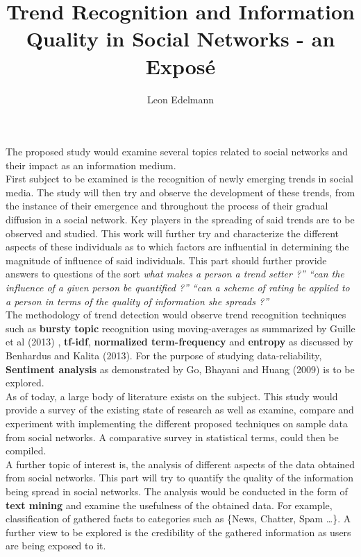 \documentclass[12pt]{article}
\begin{document}
\title{Trend Recognition and Information Quality in Social Networks - an Expos\'e}
\author{Leon Edelmann}

\maketitle
\section*{}
The proposed study would examine several topics related to social networks and their impact as an information medium. 
\\

First subject to be examined is the recognition of newly emerging trends in social media. The study will then try and observe the development of these trends, from the instance of their emergence and throughout the process of their gradual diffusion in a social network. Key players in the spreading of said trends are to be observed and studied. This work will further try and characterize the different aspects of these individuals as to which factors are influential in determining the magnitude of influence of said individuals.  This part should further provide answers to questions of the sort \textit{what makes a person a trend setter ?” “can the influence of a given person be quantified ?” “can a scheme of rating be applied to a person in terms of the quality of information she spreads ?”}
\\

The methodology of trend detection would observe trend recognition techniques such as \textbf{bursty topic} recognition using moving-averages as summarized by Guille et al (2013) \cite{guille}, \textbf{tf-idf}, \textbf{normalized term-frequency} and \textbf{entropy} as discussed by Benhardus and Kalita (2013)\cite{benhardus}. For the purpose of studying data-reliability, \textbf{Sentiment analysis} as demonstrated by Go, Bhayani and Huang (2009)\cite{go} is to be explored.
\\

As of today, a large body of literature exists on the subject. This study would provide a survey of the existing state of research as well as examine, compare and experiment with implementing the different proposed techniques on sample data from social networks. A comparative survey in statistical terms, could then be compiled.
\\

A further topic of interest is, the analysis of different aspects of the data obtained from social networks. This part will try to quantify the quality of the information being spread in social networks. The analysis would be conducted in the form of \textbf{text mining} and examine the usefulness of the obtained data. For example, classification of gathered facts to categories such as \{News, Chatter, Spam …\}. A further view to be explored is the credibility of the gathered information as users are being exposed to it. 
\\
\end{document}
